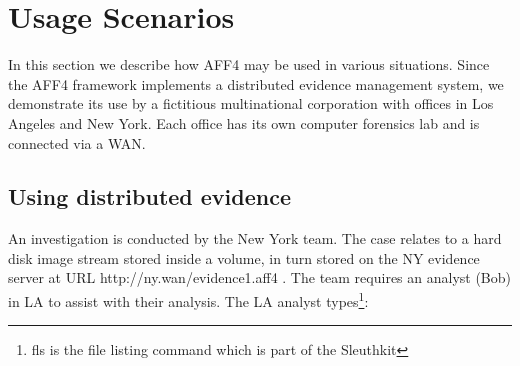 \documentclass[10pt, conference]{IEEEtran}
\begin{document}



\section{Usage Scenarios}
In this section we describe how AFF4 may be used in various
situations. Since the AFF4 framework implements a distributed evidence
management system, we demonstrate its use by a fictitious
multinational corporation with offices in Los Angeles and New
York. Each office has its own computer forensics lab and is connected
via a WAN.

\subsection{Using distributed evidence}
An investigation is conducted by the New York team. The case relates
to a hard disk image stream stored inside a volume, in turn stored on
the NY evidence server at URL http://ny.wan/evidence1.aff4 . The team
requires an analyst (Bob) in LA to assist with their analysis. The LA
analyst types\footnote{fls is the file listing command which is part
of the Sleuthkit}:
\end{document}
